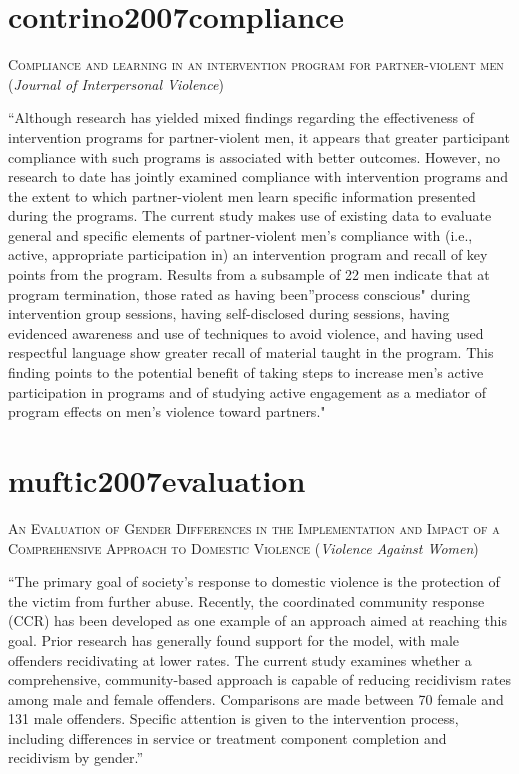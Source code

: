 \documentclass[]{tufte-handout}
\begin{document}
\section{\texorpdfstring{\textcolor[HTML]{5b0057}{contrino2007compliance}}{}}\label{section-9}

\textsc{\large{Compliance and learning in an intervention program for partner-violent men}}
(\emph{Journal of Interpersonal Violence})

``Although research has yielded mixed findings regarding the
effectiveness of intervention programs for partner-violent men, it
appears that greater participant compliance with such programs is
associated with better outcomes. However, no research to date has
jointly examined compliance with intervention programs and the extent to
which partner-violent men learn specific information presented during
the programs. The current study makes use of existing data to evaluate
general and specific elements of partner-violent men's compliance with
(i.e., active, appropriate participation in) an intervention program and
recall of key points from the program. Results from a subsample of 22
men indicate that at program termination, those rated as having
been''process conscious" during intervention group sessions, having
self-disclosed during sessions, having evidenced awareness and use of
techniques to avoid violence, and having used respectful language show
greater recall of material taught in the program. This finding points to
the potential benefit of taking steps to increase men's active
participation in programs and of studying active engagement as a
mediator of program effects on men's violence toward partners."

\section{\texorpdfstring{\textcolor[HTML]{5b0057}{muftic2007evaluation}}{}}\label{section-10}

\textsc{\large{An Evaluation of Gender Differences in the Implementation and Impact of a Comprehensive Approach to Domestic Violence}}
(\emph{Violence Against Women})

``The primary goal of society's response to domestic violence is the
protection of the victim from further abuse. Recently, the coordinated
community response (CCR) has been developed as one example of an
approach aimed at reaching this goal. Prior research has generally found
support for the model, with male offenders recidivating at lower rates.
The current study examines whether a comprehensive, community-based
approach is capable of reducing recidivism rates among male and female
offenders. Comparisons are made between 70 female and 131 male
offenders. Specific attention is given to the intervention process,
including differences in service or treatment component completion and
recidivism by gender.''
\end{document}
